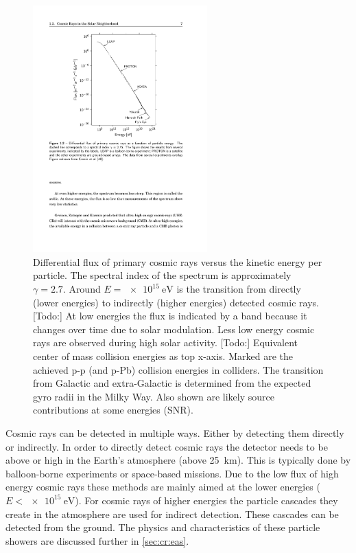 \begin{figure}
    \centering
    \includegraphics[width=0.6\textwidth]{plots/cosmic-rays/spectrum.pdf}
    \caption{Differential flux of primary cosmic rays versus the kinetic energy per particle. The spectral index of the spectrum is approximately $\gamma = 2.7$. Around $E = \SI{e15}{\eV}$ is the transition from directly (lower energies) to indirectly (higher energies) detected cosmic rays. [Todo:] At low energies the flux is indicated by a band because it changes over time due to solar modulation. Less low energy cosmic rays are observed during high solar activity. [Todo:] Equivalent center of mass collision energies as top x-axis. Marked are the achieved p-p (and p-Pb) collision energies in colliders. The transition from Galactic and extra-Galactic is determined from the expected gyro radii in the Milky Way. Also shown are likely source contributions at some energies (SNR).}
    \label{fig:spectrum}
\end{figure}


Cosmic rays can be detected in multiple ways. Either by detecting them directly or indirectly. In order to directly detect cosmic rays the detector needs to be above or high in the Earth's atmosphere (above \SI{25}{\kilo\meter}). This is typically done by balloon-borne experiments or space-based missions. Due to the low flux of high energy cosmic rays these methods are mainly aimed at the lower energies ($E < \SI{e15}{\eV}$). For cosmic rays of higher energies the particle cascades they create in the atmosphere are used for indirect detection. These cascades can be detected from the ground. The physics and characteristics of these particle showers are discussed further in \cref{sec:cr:eas}.

